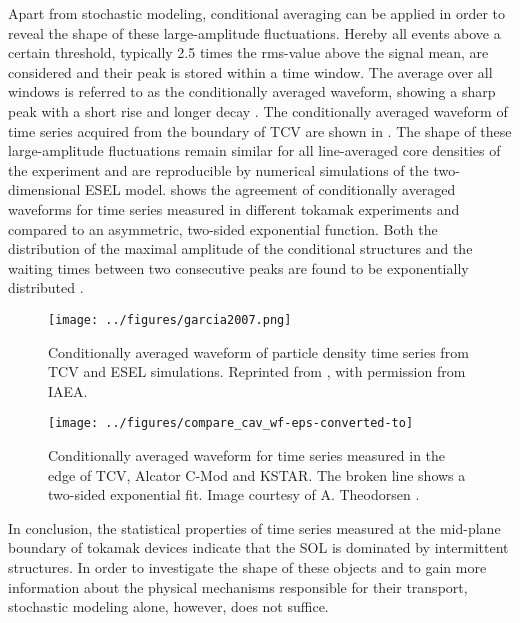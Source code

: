 Apart from stochastic modeling, conditional averaging can be applied in order to reveal
the shape of these large-amplitude fluctuations. Hereby all events above a certain
threshold, typically 2.5 times the rms-value above the signal mean, are considered and
their peak is stored within a time window. The average over all windows is referred to
as the conditionally averaged waveform, showing a sharp peak with a short rise and
longer decay
\cite{antar2003universality,boedo2005edge,garcia2007fluctuations,garcia2007collisionality,garcia2013intermittent,garcia2015intermittent,garcia2017sol,kube2018intermittent,garcia2018intermittent}.
The conditionally averaged waveform of time series acquired from the boundary of TCV are
shown in . The shape of these large-amplitude fluctuations remain
similar for all line-averaged core densities of the experiment and are reproducible by
numerical simulations of the two-dimensional ESEL model. 
shows the agreement of conditionally averaged waveforms for time series measured in
different tokamak experiments and compared to an asymmetric, two-sided exponential
function. Both the distribution of the maximal amplitude of the conditional structures
and the waiting times between two consecutive peaks are found to be exponentially
distributed
\cite{antar2005scaling,garcia2015intermittent,kube2018intermittent,garcia2017sol,garcia2018intermittent}.
\begin{figure}
  \centering
  \begin{minipage}{.48\linewidth}
    \texttt{[image: ../figures/garcia2007.png]}
    \caption{Conditionally averaged waveform of particle density time series from TCV and ESEL simulations. Reprinted from \cite{garcia2007fluctuations}, with permission from IAEA.}
    \label{Fig:garcia2007}
  \end{minipage}
  \hfill
  \begin{minipage}{.48\linewidth}
    \texttt{[image: ../figures/compare\_cav\_wf-eps-converted-to]}
    \caption{Conditionally averaged waveform for time series measured in the edge of TCV, Alcator C-Mod and KSTAR. The broken line shows a two-sided exponential fit. Image courtesy of A. Theodorsen \cite{theodorsen2018statistical}.}
    \label{Fig:theodorsen_CA}
  \end{minipage}
\end{figure}

In conclusion, the statistical properties of time series measured at the mid-plane
boundary of tokamak devices indicate that the SOL is dominated by intermittent
structures. In order to investigate the shape of these objects and to gain more
information about the physical mechanisms responsible for their transport, stochastic
modeling alone, however, does not suffice.

